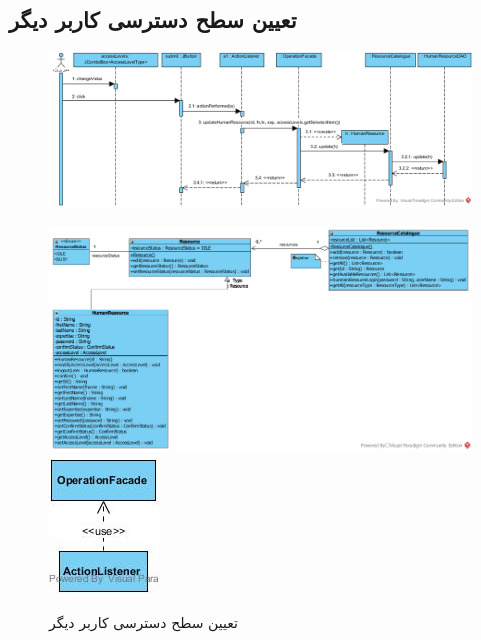 \begin{landscape}
\newpage
\section{تعیین سطح دسترسی کاربر دیگر}
\begin{figure}[H]
	\centering
	\includegraphics[scale=0.6]{img/sequence-design/SetUserAccessLevel}
\end{figure}
\begin{figure}[H]
	\centering
	\includegraphics[scale=0.6]{img/sequence-design/SetUserAccessLevelC}
	\includegraphics[scale=0.6]{img/sequence-design/SetUserAccessLevelUI}
	\caption{تعیین سطح دسترسی کاربر دیگر}
\end{figure}

\newpage

\end{landscape}
